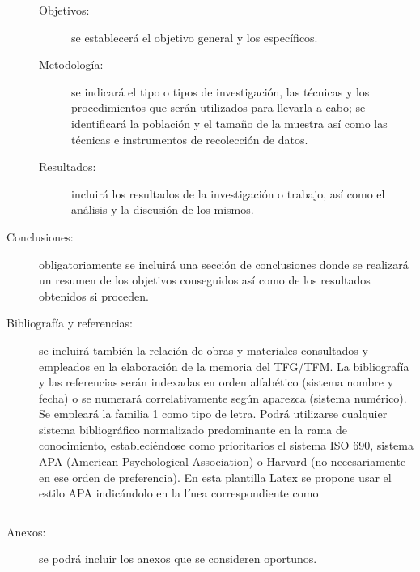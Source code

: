 \begin{description}
\begin{description}
\item[Objetivos:] se establecerá el objetivo general y los específicos.
\item[Metodología:] se indicará el tipo o tipos de investigación, las técnicas y los procedimientos que serán utilizados para llevarla a cabo; se identificará la población y el tamaño de la muestra así como las técnicas e instrumentos de recolección de datos.
\item[Resultados:] incluirá los resultados de la investigación o trabajo, así como el análisis y la discusión de los mismos.
\end{description}
\item[Conclusiones:] obligatoriamente se incluirá una sección de conclusiones donde se realizará un resumen de los objetivos conseguidos así como de los resultados obtenidos si proceden.
\item[Bibliografía y referencias:] se incluirá también la relación de obras y materiales consultados y empleados en la elaboración de la memoria del TFG/TFM. La bibliografía y las referencias serán indexadas en orden alfabético (sistema nombre y fecha) o se numerará correlativamente según aparezca (sistema numérico). Se empleará la familia 1 como tipo de letra. Podrá utilizarse cualquier sistema bibliográfico normalizado predominante en la rama de conocimiento, estableciéndose como prioritarios el sistema ISO 690, sistema APA (American Psychological Association) o Harvard (no necesariamente en ese orden de preferencia). En esta plantilla Latex se propone usar el estilo APA indicándolo en la línea correspondiente como 
\begin{verbatim}

\end{verbatim}


\item[Anexos:] se podrá incluir los anexos que se consideren oportunos.

\end{description}



